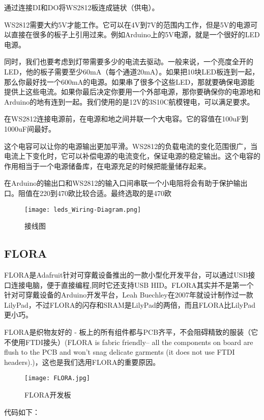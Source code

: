 通过连接DI和DO将WS2812板连成链状（供电）。

WS2812需要大约5V才能工作。它可以在4V到7V的范围内工作，但是5V的电源可以直接在很多的板子上引用过来。例如Arduino上的5V电源，就是一个很好的LED电源。

同时，我们也要考虑到灯带需要多少的电流去驱动。一般来说，一个亮度全开的LED，他的板子需要至少60mA（每个通道20mA）。如果把10块LED板连到一起，那么你最好找一个600mA的电源。如果串了很多个这些LED，那就要确保电源能提供上这些电流。如果你最后决定你要用一个外部电源，那你要确保你的电源地和Arduino的地有连到一起。我们使用的是12V的3S10C航模锂电，可以满足要求。

在WS2812连接电源前，在电源和地之间并联一个大电容。它的容值在100uF到1000uF间最好。

这个电容可以让你的电源输出更加平滑。WS2812的负载电流的变化范围很广，当电流上下变化时，它可以补偿电源的电流变化，保证电源的稳定输出。这个电容的作用相当于一个电源储备库，在电源充足的时候把能量储存起来。

在Arduino的输出口和WS2812的输入口间串联一个小电阻将会有助于保护输出口。阻值在220到470欧比较合适。最终选取的是470欧

\begin{figure}[htbp]
\centering
\texttt{[image: leds\_Wiring-Diagram.png]}
\caption{接线图} 
\label{WS012}
\end{figure}


\subsection{FLORA}

FLORA是Adafruit针对可穿戴设备推出的一款小型化开发平台，可以通过USB接口连接电脑，便于直接编程,同时它还支持USB HID。FLORA其实并不是第一个针对可穿戴设备的Arduino开发平台，Leah Buechley在2007年就设计制作过一款LilyPad，不过FLORA的闪存和SRAM是LilyPad的两倍，而且FLORA比LilyPad更小巧。

FLORA是织物友好的 - 板上的所有组件都与PCB齐平，不会阻碍精致的服装（它不使用FTDI接头）(FLORA is fabric friendly-- all the components on board are flush to the PCB and won't snag delicate garments (it does not use FTDI headers).)，这也是我们选用FLORA的重要原因。

\begin{figure}[htbp]
\centering
\texttt{[image: FLORA.jpg]}
\caption{FLORA开发板} 
\label{FLORA}
\end{figure}

代码如下：




